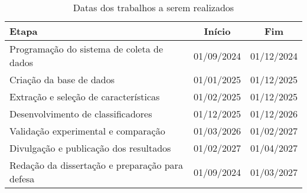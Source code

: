 		\begin{table}[h!]
			\centering
			\caption{Datas dos trabalhos a serem realizados}
			\begin{tabular}{|p{10cm}|c|c|}
				\hline
				\textbf{Etapa} & \textbf{Início} & \textbf{Fim} \\
				\hline
				Programação do sistema de coleta de dados & 01/09/2024 & 01/12/2024 \\
				\hline
				Criação da base de dados & 01/01/2025 & 01/12/2025 \\
				\hline
				Extração e seleção de características & 01/02/2025 & 01/12/2025 \\
				\hline
				Desenvolvimento de classificadores & 01/12/2025 & 01/12/2026 \\
				\hline
				Validação experimental e comparação & 01/03/2026 & 01/02/2027 \\
				\hline
				Divulgação e publicação dos resultados & 01/02/2027 & 01/04/2027 \\
				\hline
				Redação da dissertação e preparação para defesa & 01/09/2024 & 01/03/2027 \\
				\hline
			\end{tabular}
			\label{tab:cronograma}
		\end{table}
		
